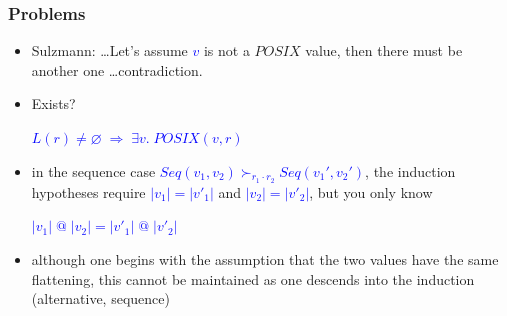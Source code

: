 \documentclass[dvipsnames,14pt,t]{beamer}
\newcommand{\bl}[1]{\textcolor{blue}{#1}}
\begin{document}
\begin{frame}[c]
\frametitle{Problems}

\begin{itemize}
\item Sulzmann: \ldots Let's assume \bl{$v$} is not 
    a $POSIX$ value, then there must be another one
    \ldots contradiction.\bigskip\pause

\item Exists?

\begin{center}
\bl{$L(r) \not= \varnothing \;\Rightarrow\; \exists v.\;POSIX(v, r)$}
\end{center}\bigskip\bigskip\pause

\item in the sequence case 
\bl{$Seq(v_1, v_2)\succ_{r_1\cdot r_2} Seq(v_1', v_2')$}, 
the induction hypotheses require
\bl{$|v_1| = |v'_1|$} and \bl{$|v_2| = |v'_2|$}, 
but you only know

\begin{center}
\bl{$|v_1| \;@\; |v_2| = |v'_1| \;@\; |v'_2|$}
\end{center}\pause\small

\item although one begins with the assumption that the two 
values have the same flattening, this cannot be maintained 
as one descends into the induction (alternative, sequence)
\end{itemize}

\end{frame}
\end{document}
